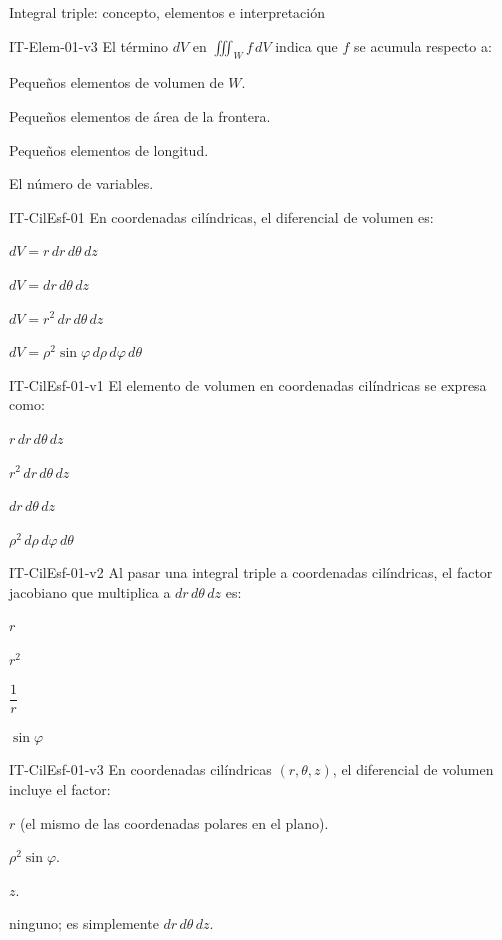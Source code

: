 \documentclass[a4,11pt]{aleph-notas}
\begin{document}
\begin{quiz}{Integral triple: concepto, elementos e interpretación}
\begin{multi}[]%
    {IT-Elem-01-v3}
    El término $dV$ en $\displaystyle\iiint_W f\,dV$ indica que $f$ se acumula respecto a:
    \item* Pequeños elementos de volumen de $W$.
    \item Pequeños elementos de área de la frontera.
    \item Pequeños elementos de longitud.
    \item El número de variables.
\end{multi}

\begin{multi}[]%
    {IT-CilEsf-01}
    En coordenadas cilíndricas, el diferencial de volumen es:
    \item* $dV = r\,dr\,d\theta\,dz$
    \item $dV = dr\,d\theta\,dz$
    \item $dV = r^2\,dr\,d\theta\,dz$
    \item $dV = \rho^2\sin\varphi\,d\rho\,d\varphi\,d\theta$
\end{multi}

\begin{multi}[]%
    {IT-CilEsf-01-v1}
    El elemento de volumen en coordenadas cilíndricas se expresa como:
    \item* $r\,dr\,d\theta\,dz$
    \item $r^2\,dr\,d\theta\,dz$
    \item $dr\,d\theta\,dz$
    \item $\rho^2\,d\rho\,d\varphi\,d\theta$
\end{multi}

\begin{multi}[]%
    {IT-CilEsf-01-v2}
    Al pasar una integral triple a coordenadas cilíndricas, el factor jacobiano que multiplica a $dr\,d\theta\,dz$ es:
    \item* $r$
    \item $r^2$
    \item $\dfrac{1}{r}$
    \item $\sin\varphi$
\end{multi}

\begin{multi}[]%
    {IT-CilEsf-01-v3}
    En coordenadas cilíndricas $(r,\theta,z)$, el diferencial de volumen incluye el factor:
    \item* $r$ (el mismo de las coordenadas polares en el plano).
    \item $\rho^2\sin\varphi$.
    \item $z$.
    \item ninguno; es simplemente $dr\,d\theta\,dz$.
\end{multi}


\end{quiz}
\end{document}
